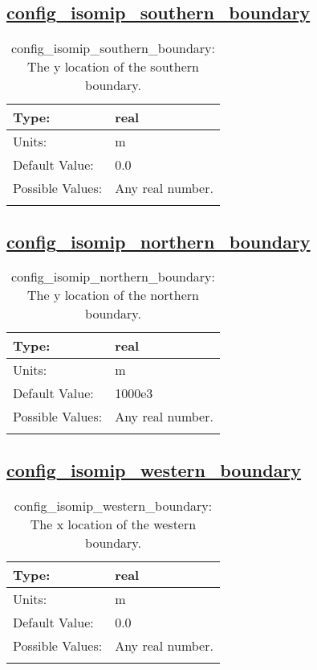 \subsection[config\_isomip\_southern\_boundary]{\hyperref[sec:nm_tab_isomip]{config\_isomip\_southern\_boundary}}
\label{subsec:nm_sec_config_isomip_southern_boundary}
\begin{center}
\begin{longtable}{| p{2.0in} || p{4.0in} |}
    \hline
    Type: & real \\
    \hline
    Units: & \si{m} \\
    \hline
    Default Value: & 0.0 \\
    \hline
    Possible Values: & Any real number. \\
    \hline
    \caption{config\_isomip\_southern\_boundary: The y location of the southern boundary.}
\end{longtable}
\end{center}
\subsection[config\_isomip\_northern\_boundary]{\hyperref[sec:nm_tab_isomip]{config\_isomip\_northern\_boundary}}
\label{subsec:nm_sec_config_isomip_northern_boundary}
\begin{center}
\begin{longtable}{| p{2.0in} || p{4.0in} |}
    \hline
    Type: & real \\
    \hline
    Units: & \si{m} \\
    \hline
    Default Value: & 1000e3 \\
    \hline
    Possible Values: & Any real number. \\
    \hline
    \caption{config\_isomip\_northern\_boundary: The y location of the northern boundary.}
\end{longtable}
\end{center}
\subsection[config\_isomip\_western\_boundary]{\hyperref[sec:nm_tab_isomip]{config\_isomip\_western\_boundary}}
\label{subsec:nm_sec_config_isomip_western_boundary}
\begin{center}
\begin{longtable}{| p{2.0in} || p{4.0in} |}
    \hline
    Type: & real \\
    \hline
    Units: & \si{m} \\
    \hline
    Default Value: & 0.0 \\
    \hline
    Possible Values: & Any real number. \\
    \hline
    \caption{config\_isomip\_western\_boundary: The x location of the western boundary.}
\end{longtable}
\end{center}
